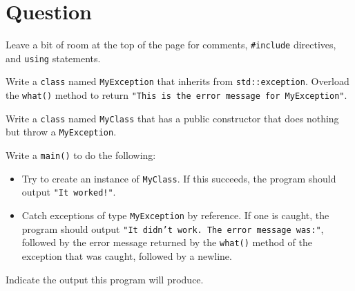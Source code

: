 \newEvenPage

\section{Question}

Leave a bit of room at the top of the page for comments,
\texttt{#include} directives, and \texttt{using} statements.

Write a \texttt{class} named \texttt{MyException} that
inherits from \texttt{std::exception}.  Overload the
\texttt{what()} method to return \texttt{"This is the error
message for MyException"}.

Write a \texttt{class} named \texttt{MyClass} that has a
public constructor that does nothing but throw a \texttt{MyException}.

Write a \texttt{main()} to do the following:
\begin{itemize}
  \item Try to create an instance of \texttt{MyClass}.  If this
    succeeds, the program should output \texttt{"It worked!\n"}.
  \item Catch exceptions of type \texttt{MyException} by reference.
    If one is caught, the program should output
    \texttt{"It didn't work.  The error message was:\n"}, followed by
    the error message returned by the \texttt{what()} method of the
    exception that was caught, followed by a newline.
\end{itemize}

Indicate the output this program will produce.

\newOddPage
\textQuestion{\makePageQuadrilleRuled}

\newpage


